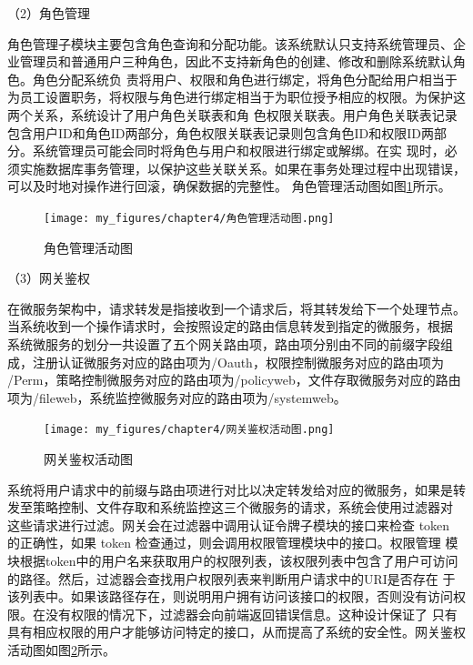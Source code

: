 

（2）角色管理

角色管理子模块主要包含角色查询和分配功能。该系统默认只支持系统管理员、企业管理员和普通用户三种角色，因此不支持新角色的创建、修改和删除系统默认角色。角色分配系统负
责将用户、权限和角色进行绑定，将角色分配给用户相当于为员工设置职务，将权限与角色进行绑定相当于为职位授予相应的权限。为保护这两个关系，系统设计了用户角色关联表和角
色权限关联表。用户角色关联表记录包含用户ID和角色ID两部分，角色权限关联表记录则包含角色ID和权限ID两部分。系统管理员可能会同时将角色与用户和权限进行绑定或解绑。在实
现时，必须实施数据库事务管理，以保护这些关联关系。如果在事务处理过程中出现错误，可以及时地对操作进行回滚，确保数据的完整性。
角色管理活动图如图\ref{fig:角色管理活动图}所示。

\begin{figure}[h]
    \centering
    \texttt{[image: my\_figures/chapter4/角色管理活动图.png]}
    \caption{角色管理活动图}
    \label{fig:角色管理活动图}
\end{figure}

（3）网关鉴权

在微服务架构中，请求转发是指接收到一个请求后，将其转发给下一个处理节点。当系统收到一个操作请求时，会按照设定的路由信息转发到指定的微服务，根据
系统微服务的划分一共设置了五个网关路由项，路由项分别由不同的前缀字段组成，注册认证微服务对应的路由项为/Oauth，权限控制微服务对应的路由项为
/Perm，策略控制微服务对应的路由项为/policyweb，文件存取微服务对应的路由项为/fileweb，系统监控微服务对应的路由项为/systemweb。

\begin{figure}[h]
    \centering
    \texttt{[image: my\_figures/chapter4/网关鉴权活动图.png]}
    \caption{网关鉴权活动图}
    \label{fig:网关鉴权活动图}
\end{figure}

系统将用户请求中的前缀与路由项进行对比以决定转发给对应的微服务，如果是转发至策略控制、文件存取和系统监控这三个微服务的请求，系统会使用过滤器对
这些请求进行过滤。网关会在过滤器中调用认证令牌子模块的接口来检查 token 的正确性，如果 token 检查通过，则会调用权限管理模块中的接口。权限管理
模块根据token中的用户名来获取用户的权限列表，该权限列表中包含了用户可访问的路径。然后，过滤器会查找用户权限列表来判断用户请求中的URI是否存在
于该列表中。如果该路径存在，则说明用户拥有访问该接口的权限，否则没有访问权限。在没有权限的情况下，过滤器会向前端返回错误信息。这种设计保证了
只有具有相应权限的用户才能够访问特定的接口，从而提高了系统的安全性。网关鉴权活动图如图\ref{fig:网关鉴权活动图}所示。



